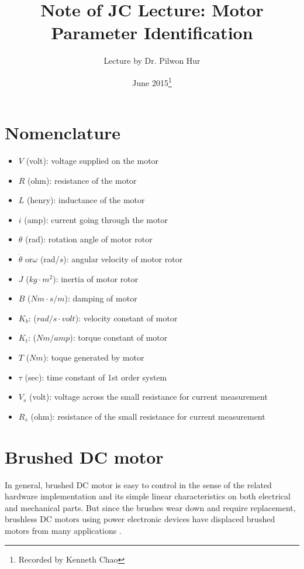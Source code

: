 \documentclass{article}
\title{Note of JC Lecture: Motor Parameter Identification}
\author{Lecture by Dr. Pilwon Hur}
\date{June 2015\footnote{Recorded by Kenneth Chao}}
\begin{document}
\maketitle

\section*{Nomenclature}
\begin{itemize}
\item[] $V$ (volt): voltage supplied on the motor
\item[] $R$ (ohm): resistance of the motor
\item[] $L$ (henry): inductance of the motor
\item[] $i$ (amp): current going through the motor
\item[] $\theta$ (rad): rotation angle of motor rotor
\item[] $\dot\theta$ or$\omega$ (rad/$s$): angular velocity of motor rotor
\item[] $J$ ($kg\cdot m^2$): inertia of motor rotor
\item[] $B$ ($Nm\cdot s/m$): damping of motor
\item[] $K_b$: ($rad/s\cdot volt$): velocity constant of motor
\item[] $K_t$: ($Nm/amp$): torque constant of motor
\item[] $T$ ($Nm$): toque generated by motor
\item[] $\tau$ (sec): time constant of 1st order system
\item[] $V_s$ (volt): voltage across the small resistance for current measurement
\item[] $R_s$ (ohm): resistance of the small resistance for current measurement
\end{itemize}
\section{Brushed DC motor}
In general, brushed DC motor is easy to control in the sense of the related hardware implementation and its simple linear characteristics on both electrical and mechanical parts. But since the brushes wear down and require replacement, brushless DC motors using power electronic devices have displaced brushed motors from many applications \cite{WikiDCM}.
\end{document}
